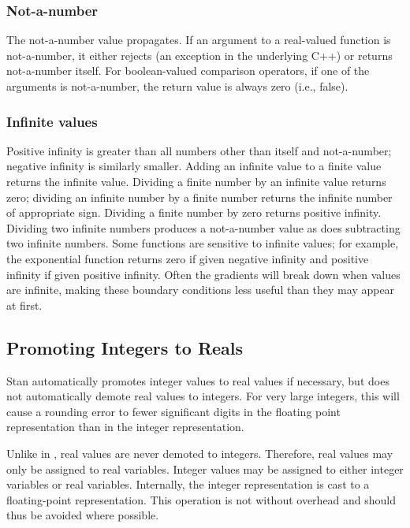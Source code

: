 \subsubsection{Not-a-number}

The not-a-number value propagates.  If an argument to a real-valued
function is not-a-number, it either rejects (an exception in the
underlying C++) or returns not-a-number itself.  For boolean-valued
comparison operators, if one of the arguments is not-a-number, the
return value is always zero (i.e., false).

\subsubsection{Infinite values}

Positive infinity is greater than all numbers other than itself and
not-a-number; negative infinity is similarly smaller.  Adding an
infinite value to a finite value returns the infinite value.  Dividing
a finite number by an infinite value returns zero; dividing an
infinite number by a finite number returns the infinite number of
appropriate sign.  Dividing a finite number by zero returns positive
infinity. Dividing two infinite numbers produces a not-a-number value
as does subtracting two infinite numbers.  Some functions are
sensitive to infinite values; for example, the exponential function
returns zero if given negative infinity and positive infinity if given
positive infinity.  Often the gradients will break down when values
are infinite, making these boundary conditions less useful than they
may appear at first.


\subsection{Promoting Integers to Reals}

Stan automatically promotes integer values to real values if
necessary, but does not automatically demote real values to integers.
For very large integers, this will cause a rounding error to fewer
significant digits in the floating point representation than in the
integer representation.

Unlike in \Cpp, real values are never demoted to integers.  Therefore,
real values may only be assigned to real variables.  Integer values
may be assigned to either integer variables or real variables.
Internally, the integer representation is cast to a floating-point
representation.  This operation is not without overhead and should
thus be avoided where possible.


